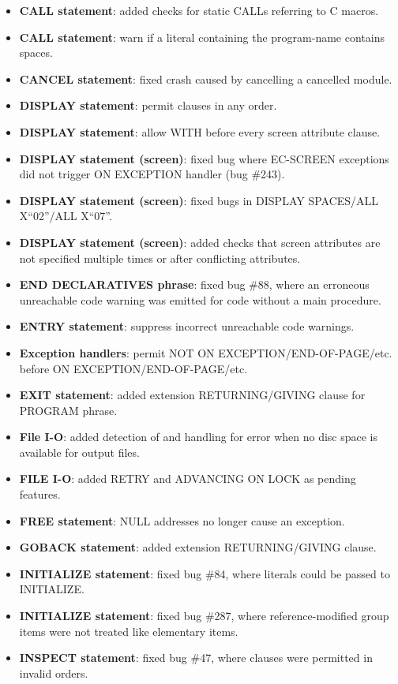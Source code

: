 \begin{itemize}
\item \textbf{CALL statement}: added checks for static CALLs referring to C macros.
\item \textbf{CALL statement}: warn if a literal containing the program-name contains spaces.
\item \textbf{CANCEL statement}: fixed crash caused by cancelling a cancelled module.
\item \textbf{DISPLAY statement}: permit clauses in any order.
\item \textbf{DISPLAY statement}: allow WITH before every screen attribute clause.
\item \textbf{DISPLAY statement (screen)}: fixed bug where EC-SCREEN exceptions did not trigger ON EXCEPTION handler (bug \#243).
\item \textbf{DISPLAY statement (screen)}: fixed bugs in DISPLAY SPACES\slash{}ALL X``02''\slash{}ALL X``07''.
\item \textbf{DISPLAY statement (screen)}: added checks that screen attributes are not specified multiple times or after conflicting attributes.
\item \textbf{END DECLARATIVES phrase}: fixed bug \#88, where an erroneous unreachable code warning was emitted for code without a main procedure.
\item \textbf{ENTRY statement}: suppress incorrect unreachable code warnings.
\item \textbf{Exception handlers}: permit NOT ON EXCEPTION\slash{}END-OF-PAGE\slash{}etc. before ON EXCEPTION\slash{}END-OF-PAGE\slash{}etc.
\item \textbf{EXIT statement}: added extension RETURNING\slash{}GIVING clause for PROGRAM phrase.
\item \textbf{File I-O}: added detection of and handling for error when no disc space is available for output files.
\item \textbf{FILE I-O}: added RETRY and ADVANCING ON LOCK as pending features.
\item \textbf{FREE statement}: NULL addresses no longer cause an exception.
\item \textbf{GOBACK statement}: added extension RETURNING\slash{}GIVING clause.
\item \textbf{INITIALIZE statement}: fixed bug \#84, where literals could be passed to INITIALIZE.
\item \textbf{INITIALIZE statement}: fixed bug \#287, where reference-modified group items were not treated like elementary items.
\item \textbf{INSPECT statement}: fixed bug \#47, where clauses were permitted in invalid orders.

\end{itemize}
